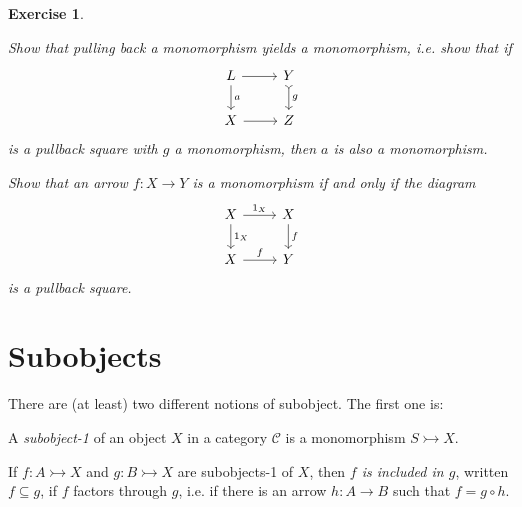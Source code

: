 \documentclass[article, a4paper, 11pt, oneside]{memoir}
\numberwithin{equation}{chapter}
\newcommand{\cat}[1]{\mathcal{#1}}
\newcommand{\catC}{\cat{C}}
\theoremstyle{myexample}
\theoremstyle{myexamplebreak}
\newtheorem{exercisebreak}[theorem]{Exercise}
\begin{document}
\begin{exercisebreak}
    \begin{enumexercise}
        \item Show that pulling back a monomorphism yields a monomorphism, i.e. show that if
        \begin{equation*}
            \begin{tikzcd}
                L
                    \ar[r]
                    \ar[d, "a"]
                & Y
                    \ar[d, "g", tail]
                \\
                X
                    \ar[r]
                & Z
            \end{tikzcd}
        \end{equation*}
        is a pullback square with $g$ a monomorphism, then $a$ is also a monomorphism.

        \item Show that an arrow $f \colon X \to Y$ is a monomorphism if and only if the diagram
        \begin{equation*}
            \begin{tikzcd}
                X
                    \ar[r, "1_X"]
                    \ar[d, "1_X"]
                & X
                    \ar[d, "f"]
                \\
                X
                    \ar[r, "f"]
                & Y
            \end{tikzcd}
        \end{equation*}
        is a pullback square.
    \end{enumexercise}
\end{exercisebreak}



\chapter{Subobjects}

There are (at least) two different notions of subobject. The first one is:

\newcommand{\tomonic}{\rightarrowtail}


\begin{definition}
    A \emph{subobject-1} of an object $X$ in a category $\catC$ is a monomorphism $S \tomonic X$.

    If $f \colon A \tomonic X$ and $g \colon B \tomonic X$ are subobjects-1 of $X$, then \emph{$f$ is included in $g$}, written $f \subseteq g$, if $f$ factors through $g$, i.e. if there is an arrow $h \colon A \to B$ such that $f = g \circ h$.
\end{definition}
\end{document}
